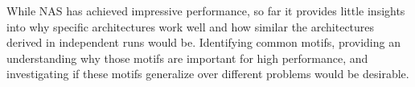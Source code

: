 \documentclass[twoside,11pt]{article}
\newcommand{\metainfo}[1]{
	\noindent~\\
	\vspace{0.25cm}
	\fcolorbox{red}{green}{\parbox{0.97\textwidth}{#1\\}}
	\vspace{0.25cm}
}
\renewcommand{\metainfo}[1]{}
\begin{document}
While NAS has achieved impressive performance, so far it provides little insights into why specific architectures work well and how similar the architectures derived in independent runs would be. Identifying common motifs, providing an understanding why those motifs are important for high performance, and investigating if these motifs generalize over different problems would be desirable. 






%


\metainfo{2 pages}
\end{document}
